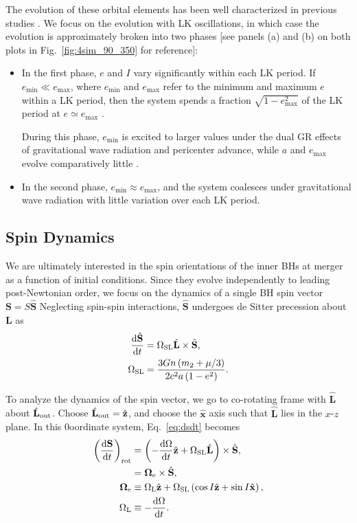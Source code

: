 \documentclass[
        fleqn,
        usenatbib,
    ]{mnras}
\newcommand*{\rd}[2]{\frac{\mathrm{d}#1}{\mathrm{d}#2}}
\newcommand*{\bm}[1]{\boldsymbol{\mathbf{#1}}}
\newcommand*{\uv}[1]{\hat{\bm{#1}}}
\newcommand*{\p}[1]{\left(#1\right)}
\begin{document}
The evolution of these orbital elements has been well characterized in previous
studies \citep{anderson2016formation,bin1}. We focus on the evolution with LK
oscillations, in which case the evolution is approximately broken into two
phases [see panels (a) and (b) on both plots in Fig.~\ref{fig:4sim_90_350} for
reference]:
\begin{itemize}
    \item In the first phase, $e$ and $I$ vary significantly within each LK
        period. If $e_{\min} \ll e_{\max}$, where $e_{\min}$ and $e_{\max}$
        refer to the minimum and maximum $e$ within a LK period, then the system
        spends a fraction $\sqrt{1 - e_{\max}^{2}}$ of the LK period at $e
        \simeq e_{\max}$ \citep{anderson2016formation}.

        During this phase, $e_{\min}$ is excited to larger values under the dual
        GR effects of gravitational wave radiation and pericenter advance, while
        $a$ and $e_{\max}$ evolve comparatively little .

    \item In the second phase, $e_{\min} \approx e_{\max}$, and the system
        coalesces under gravitational wave radiation with little variation over
        each LK period.
\end{itemize}

\subsection{Spin Dynamics}

We are ultimately interested in the spin orientations of the inner BHs at merger
as a function of initial conditions. Since they evolve independently to leading
post-Newtonian order, we focus on the dynamics of a single BH spin vector
$\bm{S} = S\uv{S}$ Neglecting spin-spin interactions, $\uv{S}$ undergoes de
Sitter precession about $\bm{L}$ as
\begin{align}
    \rd{\hat{\bm{S}}}{t} &= \Omega_{\rm SL}\hat{\bm{L}} \times \hat{\bm{S}}
            \label{eq:dsdt},\\
        \Omega_{\rm SL} &= \frac{3Gn\p{m_2 + \mu/3}}{2c^2a\p{1 - e^2}}.
\end{align}

To analyze the dynamics of the spin vector, we go to co-rotating frame with
$\uv{L}$ about $\uv{L}_{\rm out}$. Choose $\uv{L}_{\rm out} = \uv{z}$, and
choose the $\uv{x}$ axis such that $\uv{L}$ lies in the $x$-$z$ plane. In this
0oordinate system, Eq.~\eqref{eq:dsdt} becomes
\begin{align}
    \p{\rd{\bm{S}}{t}}_{\rm rot}
        &= \p{-\rd{\Omega}{t}\uv{z} + \Omega_{\rm SL}\uv{L}} \times \uv{S},\\
        &= \bm{\Omega}_{\rm e} \times \uv{S}\label{eq:dsdt_weff},\\
    \bm{\Omega}_{\rm e} &\equiv \Omega_{\rm L}\uv{z} + \Omega_{\rm SL}
            \p{\cos I \uv{z} + \sin I \uv{x}},\label{eq:weff_def}\\
    \Omega_{\rm L} &\equiv -\rd{\Omega}{t}.
\end{align}
\end{document}
